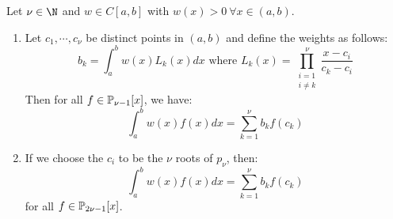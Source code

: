 \documentclass[../Main.tex]{subfiles}
\begin{document}
\begin{theorem}
    Let $\nu \in \N$ and $w \in C[a, b]$ with $w(x) > 0~\forall x \in (a, b)$.
    \begin{enumerate}
        \item Let $c_1, \cdots, c_\nu$ be distinct points in $(a, b)$ and define the weights as follows:
            \begin{equation*}
                b_k = \int_{a}^{b} w(x) L_k(x) dx \text{ where } L_k(x) = \prod_{\substack{i=1\\i\neq k}}^{\nu} \frac{x - c_i}{c_k - c_i}
            \end{equation*}
            Then for all $f \in \P_{\nu - 1}[x]$, we have:
            \begin{equation*}
                \int_{a}^{b} w(x) f(x) dx = \sum_{k=1}^{\nu} b_k f(c_k)
            \end{equation*}
        \item If we choose the $c_i$ to be the $\nu$ roots of $p_{\nu}$, then:
            \begin{equation*}
                \int_{a}^{b} w(x) f(x) dx = \sum_{k=1}^{\nu} b_k f(c_k)
            \end{equation*}
            for all $f \in \P_{2\nu - 1}[x]$.
    \end{enumerate}
    \label{thmGaussQuadrat}
\end{theorem}
\end{document}
